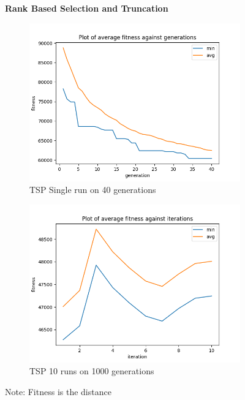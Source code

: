 \documentclass[a4paper]{exam}
\begin{document}
\begin{questions}
  \begin{figure}[!ht]
    \centering
    \textbf{Rank Based Selection and Truncation}
    \begin{subfigure}{.5\textwidth}
      \centering
      \includegraphics[width=1\linewidth]{images/tsp_rbs_tn_gen.png}
      \caption{TSP Single run on 40 generations}
      \label{fig:tsp_rbs_tn_sub1}
    \end{subfigure}%
    \begin{subfigure}{.5\textwidth}
      \centering
      \includegraphics[width=1\linewidth]{images/tsp_rbs_tn_itr.png}
      \caption{TSP 10 runs on 1000 generations}
      \label{fig:tsp_rbs_tn_sub2}
    \end{subfigure}
    \caption{Note: Fitness is the distance}
    \label{fig:tsp_rbs_tn}
  \end{figure}

  \newpage
  

\end{questions}
\end{document}
